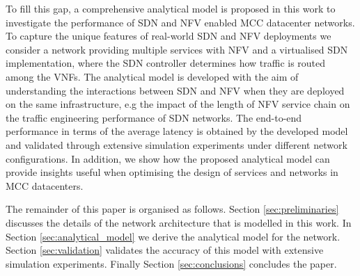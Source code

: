 To fill this gap, a comprehensive analytical model is proposed in this work to investigate the performance of SDN and NFV enabled MCC datacenter networks. To capture the unique features of real-world SDN and NFV deployments we consider a network providing multiple services with NFV and a virtualised SDN implementation, where the SDN controller determines how traffic is routed among the VNFs. The analytical model is developed with the aim of understanding the interactions between SDN and NFV when they are deployed on the same infrastructure, e.g the impact of the length of NFV service chain on the traffic engineering performance of SDN networks. The end-to-end performance in terms of the average latency is obtained by the developed model and validated through extensive simulation experiments under different network configurations. In addition, we show how the proposed analytical model can provide insights useful when optimising the design of services and networks in MCC datacenters.

The remainder of this paper is organised as follows. Section \ref{sec:preliminaries} discusses the details of the network architecture that is modelled in this work. In Section \ref{sec:analytical_model} we derive the analytical model for the network. Section \ref{sec:validation} validates the accuracy of this model with extensive simulation experiments. Finally Section \ref{sec:conclusions} concludes the paper.
